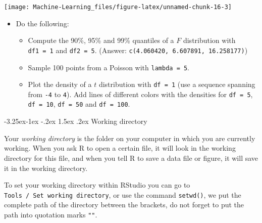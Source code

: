 \documentclass[]{book}
\makeatletter
\newenvironment{Shaded}{\begin{snugshade}}{\end{snugshade}}
\newcommand{\KeywordTok}[1]{\textcolor[rgb]{0.13,0.29,0.53}{\textbf{#1}}}
\newcommand{\DataTypeTok}[1]{\textcolor[rgb]{0.13,0.29,0.53}{#1}}
\newcommand{\DecValTok}[1]{\textcolor[rgb]{0.00,0.00,0.81}{#1}}
\newcommand{\FloatTok}[1]{\textcolor[rgb]{0.00,0.00,0.81}{#1}}
\newcommand{\CommentTok}[1]{\textcolor[rgb]{0.56,0.35,0.01}{\textit{#1}}}
\newcommand{\NormalTok}[1]{#1}
\providecommand{\tightlist}{%
  \setlength{\itemsep}{0pt}\setlength{\parskip}{0pt}}
\newenvironment{rmdblock}[1]
  {\begin{shaded*}
  \begin{itemize}
  \renewcommand{\labelitemi}{
    \raisebox{-.7\height}[0pt][0pt]{
      {\setkeys{Gin}{width=2em,keepaspectratio}\texttt{[image: img/icons/\#1]}}
    }
  }
  \item
  }
  {
  \end{itemize}
  \end{shaded*}
  }
\newenvironment{rmdexercise}
  {\begin{rmdblock}{exercise}}
  {\end{rmdblock}}
\renewcommand\subsection{\@startsection{subsection}{2}{\z@}%
                                     {-3.25ex\@plus -1ex \@minus -.2ex}%
                                     {1.5ex \@plus .2ex}%
                                     {\normalfont\large\bfseries\color{Violet}}}
\theoremstyle{definition}
\theoremstyle{definition}
\theoremstyle{definition}
\theoremstyle{remark}
\makeatother
\begin{document}
\begin{center}\texttt{[image: Machine-Learning\_files/figure-latex/unnamed-chunk-16-3]} \end{center}

\begin{Shaded}
\end{Shaded}

\begin{rmdexercise}
Do the following:

\begin{itemize}
\tightlist
\item
  Compute the 90\%, 95\% and 99\% quantiles of a \(F\) distribution with
  \texttt{df1\ =\ 1} and \texttt{df2\ =\ 5}. (Answer:
  \texttt{c(4.060420,\ 6.607891,\ 16.258177)})
\item
  Sample 100 points from a Poisson with \texttt{lambda\ =\ 5}.
\item
  Plot the density of a \(t\) distribution with \texttt{df\ =\ 1} (use a
  sequence spanning from \texttt{-4} to \texttt{4}). Add lines of
  different colors with the densities for \texttt{df\ =\ 5},
  \texttt{df\ =\ 10}, \texttt{df\ =\ 50} and \texttt{df\ =\ 100}.
\end{itemize}
\end{rmdexercise}

\subsection{Working directory}\label{working-directory}

Your \emph{working directory} is the folder on your computer in which
you are currently working. When you ask R to open a certain file, it
will look in the working directory for this file, and when you tell R to
save a data file or figure, it will save it in the working directory.

To set your working directory within RStudio you can go to
\texttt{Tools\ /\ Set\ working\ directory}, or use the command
\texttt{setwd()}, we put the complete path of the directory between the
brackets, do not forget to put the path into quotation marks
\texttt{""}.
\end{document}
